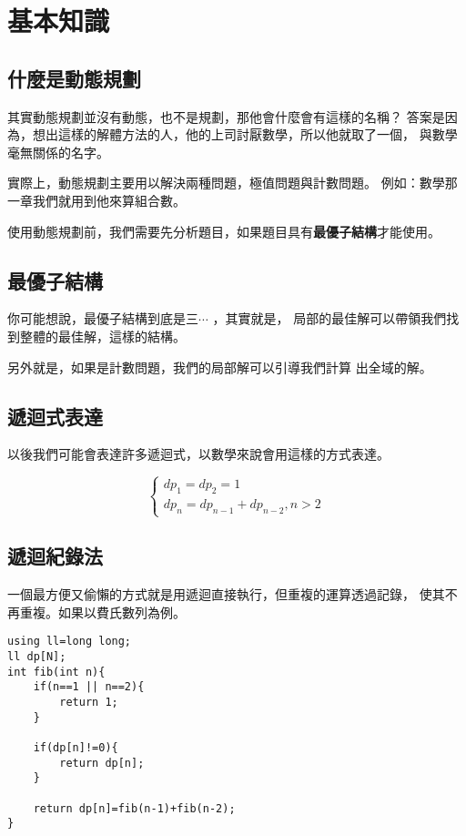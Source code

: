 \section{基本知識}
    \subsection{什麼是動態規劃}
    其實動態規劃並沒有動態，也不是規劃，那他會什麼會有這樣的名稱？
    答案是因為，想出這樣的解體方法的人，他的上司討厭數學，所以他就取了一個，
    與數學毫無關係的名字。

    實際上，動態規劃主要用以解決兩種問題，極值問題與計數問題。
    例如：數學那一章我們就用到他來算組合數。

    使用動態規劃前，我們需要先分析題目，如果題目具有\textbf{最優子結構}才能使用。

    \subsection{最優子結構}
    你可能想說，最優子結構到底是三$\cdots$ ，其實就是，
    局部的最佳解可以帶領我們找到整體的最佳解，這樣的結構。

    另外就是，如果是計數問題，我們的局部解可以引導我們計算
    出全域的解。

    \subsection{遞迴式表達}
    以後我們可能會表達許多遞迴式，以數學來說會用這樣的方式表達。

    $$
    \begin{cases}
        dp_1=dp_2=1 \\ 
        dp_n=dp_{n-1}+dp_{n-2}, n > 2
    \end{cases}
    $$

    \subsection{遞迴紀錄法}
    一個最方便又偷懶的方式就是用遞迴直接執行，但重複的運算透過記錄，
    使其不再重複。如果以費氏數列為例。

\begin{lstlisting}[caption=費氏數列的遞迴DP]
using ll=long long;
ll dp[N];
int fib(int n){
    if(n==1 || n==2){
        return 1;
    }

    if(dp[n]!=0){
        return dp[n];
    }

    return dp[n]=fib(n-1)+fib(n-2);
}
\end{lstlisting}

